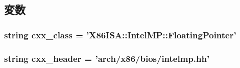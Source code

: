 \subsection{変数}
\hypertarget{classIntelMP_1_1X86IntelMPFloatingPointer_a58cd55cd4023648e138237cfc0822ae3}{
\subsubsection[{cxx\_\-class}]{\setlength{\rightskip}{0pt plus 5cm}string {\bf cxx\_\-class} = '{\bf X86ISA::IntelMP::FloatingPointer}'}}
\label{classIntelMP_1_1X86IntelMPFloatingPointer_a58cd55cd4023648e138237cfc0822ae3}
\hypertarget{classIntelMP_1_1X86IntelMPFloatingPointer_a17da7064bc5c518791f0c891eff05fda}{
\subsubsection[{cxx\_\-header}]{\setlength{\rightskip}{0pt plus 5cm}string {\bf cxx\_\-header} = 'arch/x86/bios/intelmp.hh'}}
\label{classIntelMP_1_1X86IntelMPFloatingPointer_a17da7064bc5c518791f0c891eff05fda}


